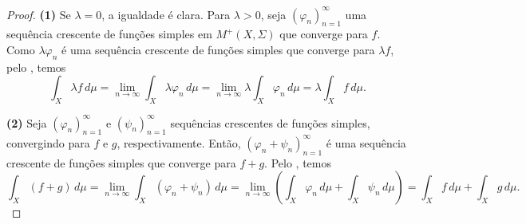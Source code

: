 \begin{proof}
    \textbf{(1)} Se $\lambda = 0$, a igualdade é clara. Para $\lambda > 0$, seja $(\varphi_n)_{n=1}^{\infty}$ uma sequência crescente de funções simples em $M^+(X, \Sigma)$ que converge para $f$. Como $\lambda \varphi_n$ é uma sequência crescente de funções simples que converge para $\lambda f$, pelo , temos
    \begin{equation*}
    \int_X \lambda f \, d\mu = \lim_{n \to \infty} \int_X \lambda \varphi_n \, d\mu = \lim_{n \to \infty} \lambda \int_X \varphi_n \, d\mu = \lambda \int_X f \, d\mu.
    \end{equation*}

    \textbf{(2)} Seja $(\varphi_n)_{n=1}^{\infty}$ e $(\psi_n)_{n=1}^{\infty}$ sequências crescentes de funções simples, convergindo para $f$ e $g$, respectivamente. Então, $(\varphi_n + \psi_n)_{n=1}^{\infty}$ é uma sequência crescente de funções simples que converge para $f + g$. Pelo , temos
    \begin{equation*}
    \int_X (f + g) \, d\mu = \lim_{n \to \infty} \int_X (\varphi_n + \psi_n) \, d\mu = \lim_{n \to \infty} \left( \int_X \varphi_n \, d\mu + \int_X \psi_n \, d\mu \right) = \int_X f \, d\mu + \int_X g \, d\mu.
    \end{equation*}
\end{proof}
